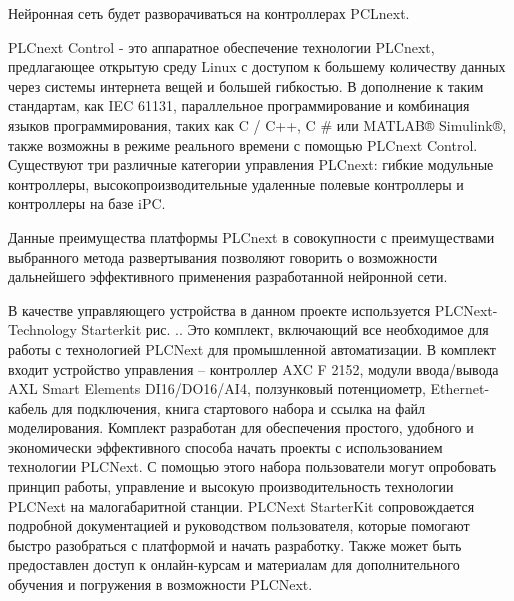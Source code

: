 {\gostFont
	
	\par \redline Нейронная сеть будет разворачиваться на контроллерах PCLnext.
	
	\par \redline PLCnext Control - это аппаратное обеспечение технологии PLCnext, предлагающее открытую среду Linux с доступом к большему количеству данных через системы интернета вещей и большей гибкостью. В дополнение к таким стандартам, как IEC 61131, параллельное программирование и комбинация языков программирования, таких как C / C++, C \# или MATLAB® Simulink®, также возможны в режиме реального времени с помощью PLCnext Control. Существуют три различные категории управления PLCnext: гибкие модульные контроллеры, высокопроизводительные удаленные полевые контроллеры и контроллеры на базе iPC.  
	
	\par \redline Данные преимущества платформы PLCnext в совокупности с преимуществами выбранного метода развертывания позволяют говорить о возможности дальнейшего эффективного применения разработанной нейронной сети.  
	
	\par \redline В качестве управляющего устройства в данном проекте используется PLCNext-Technology Starterkit  рис. \thechaptercntr.\theimagecntr. Это комплект, включающий все необходимое для работы с технологией PLCNext для промышленной автоматизации. В комплект входит устройство управления {--} контроллер AXC F 2152, модули ввода/вывода AXL Smart Elements DI16/DO16/AI4, ползунковый потенциометр, Ethernet-кабель для подключения, книга стартового набора и ссылка на файл моделирования. Комплект разработан для обеспечения простого, удобного и экономически эффективного способа начать проекты с использованием технологии PLCNext. С помощью этого набора пользователи могут опробовать принцип работы, управление и высокую производительность технологии PLCNext на малогабаритной станции. PLCNext StarterKit сопровождается подробной документацией и руководством пользователя, которые помогают быстро разобраться с платформой и начать разработку. Также может быть предоставлен доступ к онлайн-курсам и материалам для дополнительного обучения и погружения в возможности PLCNext.
	
}
